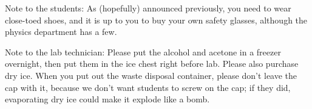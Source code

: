 \label{lab:absolute-zero}

Note to the students:
As (hopefully) announced previously, you need to wear close-toed
shoes, and it is up to you
to buy your own safety glasses, although the physics department
has a few. 

Note to the lab technician: 
Please put the alcohol and acetone in a freezer overnight, then
put them in the ice chest right before lab. Please also purchase
dry ice. When you put out the waste disposal container, please
don't leave the cap with it, because we don't want students to screw
on the cap; if they did, evaporating dry ice could make it explode like a bomb.

\apparatus
{}

\introduction

